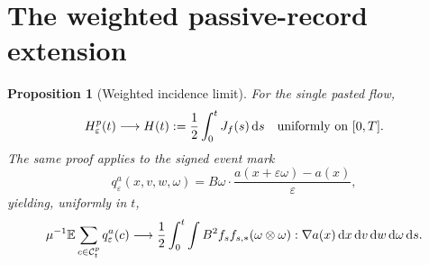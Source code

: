 \documentclass[11pt,letterpaper]{article}
\numberwithin{equation}{section}
\newtheorem{proposition}[theorem]{Proposition}
\theoremstyle{definition}\newtheorem{assumption}[theorem]{Assumption}
\theoremstyle{remark}\newtheorem{remark}[theorem]{Remark}
\newcommand{\eps}{\varepsilon}\newcommand{\dd}{\,\mathrm d}
\begin{document}
\section{The weighted passive-record extension}\label{sec:weighted}
\begin{proposition}[Weighted incidence limit]\label{prop:incidence}
For the single pasted flow,
\begin{equation}\label{eq:pasted-limit}
 H_\eps^p(t)\longrightarrow H(t):=\frac12\int_0^tJ_f(s)\dd s
 \quad\hbox{uniformly on }[0,T].
\end{equation}
The same proof applies to the signed event mark
\begin{equation}\label{eq:qmark}
 q_\eps^a(x,v,w,\omega)
 =B\omega\cdot\frac{a(x+\eps\omega)-a(x)}{\eps},
\end{equation}
yielding, uniformly in $t$,
\begin{equation}\label{eq:signed-limit}
 \mu^{-1}\E\sum_{c\in\mathcal C_t^p}q_\eps^a(c)
 \longrightarrow\frac12\int_0^t\int B^2 f_sf_{s,*}
                         (\omega\otimes\omega):\nabla a(x)\dd x\dd v\dd w\dd\omega\dd s.
\end{equation}
\end{proposition}
\end{document}

